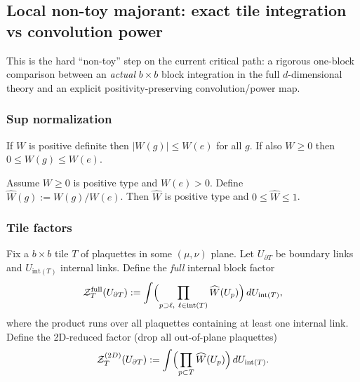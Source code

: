 \subsection{Local non-toy majorant: exact tile integration vs convolution power}\label{sec:majorant}

This is the hard ``non-toy'' step on the current critical path: a rigorous one-block comparison between an \emph{actual} $b\times b$ block integration in the full $d$-dimensional theory and an explicit positivity-preserving convolution/power map.

\subsubsection{Sup normalization}

\begin{lemma}\label{lem:pd_max_identity}
If $W$ is positive definite then $|W(g)|\le W(e)$ for all $g$.
If also $W\ge 0$ then $0\le W(g)\le W(e)$.
\end{lemma}

\begin{definition}\label{def:sup_norm}
Assume $W\ge 0$ is positive type and $W(e)>0$.
Define $\widehat W(g):=W(g)/W(e)$.
Then $\widehat W$ is positive type and $0\le \widehat W\le 1$.
\end{definition}

\subsubsection{Tile factors}

Fix a $b\times b$ tile $T$ of plaquettes in some $(\mu,\nu)$ plane.
Let $U_{\partial T}$ be boundary links and $U_{\mathrm{int}(T)}$ internal links.
Define the \emph{full} internal block factor
\begin{equation}\label{eq:block_factor_full}
\mathcal Z_T^{\mathrm{full}}(U_{\partial T})
:=
\int
\Bigl(\prod_{p\supset \ell,\ \ell\in\mathrm{int}(T)} \widehat W(U_p)\Bigr)
\,dU_{\mathrm{int}(T)},
\end{equation}
where the product runs over all plaquettes containing at least one internal link.
Define the 2D-reduced factor (drop all out-of-plane plaquettes)
\begin{equation}\label{eq:block_factor_2d}
\mathcal Z_T^{(2D)}(U_{\partial T})
:=
\int
\Bigl(\prod_{p\subset T} \widehat W(U_p)\Bigr)
\,dU_{\mathrm{int}(T)}.
\end{equation}

